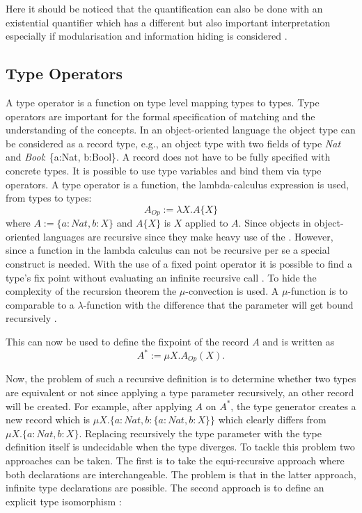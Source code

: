 Here it should be noticed that the quantification can also be done with an
existential quantifier which has a different but also important
interpretation especially if modularisation and information hiding is
considered \cite{cameron_existential_2009,pierce_types_2002}.

\subsection{Type Operators}
 A type operator is a function on type level mapping types to
types. Type operators are important for the formal specification of
matching and the understanding of the concepts. In an object-oriented
language the object type can be considered as a record type, e.g.,
an object type with two fields of type \emph{Nat} and \emph{Bool}:
\{a:Nat, b:Bool\}. A record does not have to be fully specified with
concrete types. It is possible to use type variables and bind them
via type operators. A type operator is a function, the lambda-calculus
expression is used, from types to types: \[A_{Op} := \lambda X.A\{X\}
\] where $A := \{a:Nat, b:X\}$ and $A\{X\}$ is $X$ applied to $A$. Since
objects in object-oriented languages are recursive since they make heavy
use of the \mytype. However, since a function in the lambda calculus
can not be recursive per se a special construct is needed. With
the use of a fixed point operator it is possible
to find a type's fix point without evaluating an infinite recursive
call \cite{gabriel_why_1988}. To hide the complexity of the recursion
theorem the $\mu$-convection is used. A $\mu$-function is to comparable
to a $\lambda$-function with the difference that the parameter will get
bound recursively \cite{pierce_types_2002,simons_theory_2002-3}.

This can now be used to define the fixpoint of the record $A$ and is
written as \[A^* := \mu X.A_{Op}(X).\]

Now, the problem of such a recursive definition is to determine whether
two types are equivalent or not since applying a type parameter
recursively, an other record will be created. For example, after
applying $A$ on $A^*$, the type generator creates a new record which
is $\mu X.\{a:Nat, b:\{a:Nat, b:X\}\}$ which clearly differs from $\mu
X.\{a:Nat, b:X\}$. Replacing recursively the type parameter with the
type definition itself is undecidable when the type diverges. To tackle
this problem two approaches can be taken. The first is to take the
equi-recursive approach where both declarations are interchangeable. The
problem is that in the latter approach, infinite type declarations
are possible. The second approach is to define an explicit type
isomorphism
\cite{abadi_subtyping_1996}:

